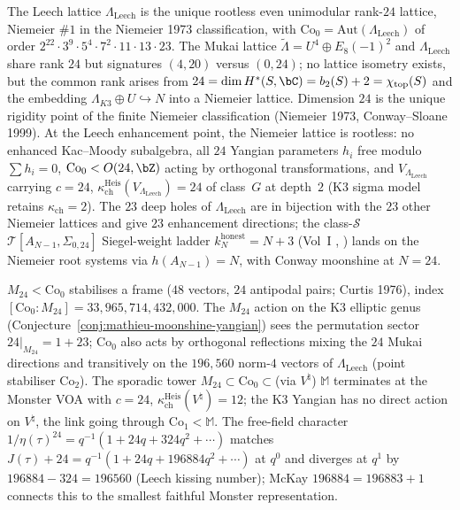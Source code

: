 The Leech lattice $\Lambda_{\mathrm{Leech}}$ is the unique rootless
even unimodular rank-$24$ lattice, Niemeier $\#1$ in the Niemeier 1973
classification, with $\mathrm{Co}_0=\mathrm{Aut}(\Lambda_{\mathrm{Leech}})$
of order $2^{22}\cdot 3^9\cdot 5^4\cdot 7^2\cdot 11\cdot 13\cdot 23$.
The Mukai lattice $\widetilde\Lambda = U^4\oplus E_8(-1)^2$ and
$\Lambda_{\mathrm{Leech}}$ share rank $24$ but signatures $(4,20)$
versus $(0,24)$; no lattice isometry exists, but the common rank
arises from $24 = \dim H^*(S,\bC) = b_2(S)+2 = \chi_{\mathrm{top}}(S)$
and the embedding $\Lambda_{K3}\oplus U\hookrightarrow N$ into a
Niemeier lattice. Dimension $24$ is the unique rigidity point of the
finite Niemeier classification (Niemeier 1973, Conway--Sloane 1999).
At the Leech enhancement point, the Niemeier lattice is rootless: no
enhanced Kac--Moody subalgebra, all $24$ Yangian parameters $h_i$ free
modulo $\sum h_i = 0$, $\mathrm{Co}_0 < O(24,\bZ)$ acting by orthogonal
transformations, and $V_{\Lambda_{\mathrm{Leech}}}$ carrying $c=24$,
$\kappa_{\mathrm{ch}}^{\mathrm{Heis}}(V_{\Lambda_{\mathrm{Leech}}})=24$
of class~$G$ at depth~$2$ (K3 sigma model retains $\kappa_{\mathrm{ch}}=2$).
The $23$ deep holes of $\Lambda_{\mathrm{Leech}}$ are in bijection with
the $23$ other Niemeier lattices and give $23$ enhancement directions;
the class-$\mathcal S$ $\mathcal T[A_{N-1},\Sigma_{0,24}]$ Siegel-weight
ladder $k_N^{\mathrm{honest}}=N+3$ (Vol~I
\cite{VolI},
\cite{VolI}) lands on the Niemeier root systems
via $h(A_{N-1})=N$, with Conway moonshine at $N=24$.

$M_{24}<\mathrm{Co}_0$ stabilises a frame ($48$ vectors, $24$ antipodal
pairs; Curtis 1976), index $[\mathrm{Co}_0:M_{24}] = 33{,}965{,}714{,}432{,}000$.
The $M_{24}$ action on the K3 elliptic genus
(Conjecture~\ref{conj:mathieu-moonshine-yangian}) sees the permutation
sector $24|_{M_{24}} = 1+23$; $\mathrm{Co}_0$ also acts by
orthogonal reflections mixing the $24$ Mukai directions and transitively
on the $196{,}560$ norm-$4$ vectors of $\Lambda_{\mathrm{Leech}}$ (point
stabiliser $\mathrm{Co}_2$). The sporadic tower $M_{24}\subset
\mathrm{Co}_0\subset$(via $V^\natural$) $\mathbb{M}$ terminates at the
Monster VOA with $c=24$, $\kappa_{\mathrm{ch}}^{\mathrm{Heis}}(V^\natural)=12$;
the K3 Yangian has no direct action on $V^\natural$, the link going
through $\mathrm{Co}_1<\mathbb{M}$. The free-field character
$1/\eta(\tau)^{24} = q^{-1}(1 + 24q + 324q^2 + \cdots)$ matches
$J(\tau) + 24 = q^{-1}(1 + 24q + 196884q^2 + \cdots)$ at $q^0$ and
diverges at $q^1$ by $196884 - 324 = 196560$ (Leech kissing number);
McKay $196884 = 196883 + 1$ connects this to the smallest faithful
Monster representation.

